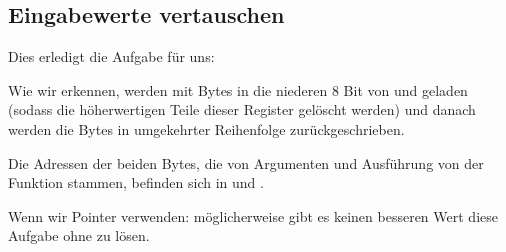 \subsection{Eingabewerte vertauschen}

Dies erledigt die Aufgabe für uns:


Wie wir erkennen, werden mit  Bytes in die niederen 8 Bit von  und  geladen (sodass die
höherwertigen Teile dieser Register gelöscht werden) und danach werden die Bytes in umgekehrter Reihenfolge
zurückgeschrieben.


Die Adressen der beiden Bytes, die von Argumenten und Ausführung von der Funktion stammen, befinden sich in  und
. 

Wenn wir Pointer verwenden: möglicherweise gibt es keinen besseren Wert diese Aufgabe ohne zu lösen.